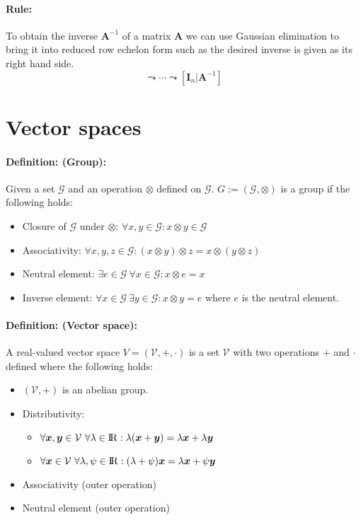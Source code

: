 \documentclass[12pt]{article}
\newcommand{\R}{{\rm I\!R}}
\newcommand{\A}{{\bm{A}}}
\newcommand{\xdefinition}[2]{\paragraph{\colorbox{#1!30}{\textbf{Definition:}} (#2):}}
\newcommand{\xrule}[1]{\paragraph{\colorbox{#1!30}{\textbf{Rule:}}}}
\newcommand{\mc}[1]{\mathcal{#1}}
\begin{document}
\xrule{red} To obtain the inverse $\A^{-1}$ of a matrix $\A$ we can use Gaussian elimination to bring it into reduced row echelon form such as the desired inverse is given as its right hand side.
% 
\begin{equation}
	[\bm{A}|\bm{I}_n] \leadsto \cdots \leadsto [\bm{I}_n|\bm{A}^{-1}]
\end{equation}

\section{Vector spaces}

\xdefinition{green}{Group} Given a set $\mc{G}$ and an operation $\otimes$ defined on $\mc{G}$. $G := (\mc{G}, \otimes)$ is a group if the following holds:
%
\begin{itemize}
	\item Closure of $\mc{G}$ under $\otimes$: $\forall x, y \in \mc{G} : x \otimes y \in \mc{G}$
	\item Associativity: $\forall x, y, z \in \mc{G} : (x \otimes y) \otimes z = x \otimes (	y \otimes z)$
	\item Neutral element: $\exists e \in \mc{G} \ \forall x \in \mc{G} : x \otimes e = x$
	\item Inverse element: $\forall x \in \mc{G} \ \exists y \in \mc{G}: x \otimes y = e$ where $e$ is the neutral element.
\end{itemize}

\xdefinition{blue}{Vector space} A real-valued vector space $V = (\mc{V}, +, \cdot)$ is a set $\mc{V}$ with two operations $+$ and $\cdot$ defined where the following holds:
%
\begin{itemize}
	\item $(\mc{V}, +)$ is an abelian group.
	\item Distributivity:
	\begin{itemize}
	\item $\forall \bm{x}, \bm{y} \in \mc{V} \ \forall \lambda \in \R : \lambda(\bm{x} + \bm{y}) = \lambda \bm{x} + \lambda \bm{y}$
	\item $\forall \bm{x} \in \mc{V} \ \forall \lambda, \psi \in \R : (\lambda + \psi) \bm{x} = \lambda \bm{x} + \psi \bm{y}$
	\end{itemize}
	\item Associativity (outer operation)
	\item Neutral element (outer operation)
\end{itemize}
%
\end{document}
